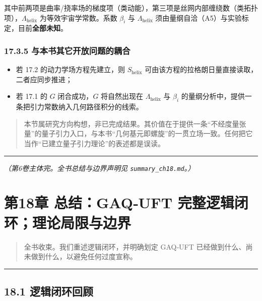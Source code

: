 其中前两项是曲率/挠率场的梯度项（类动能），第三项是丝网内部缠绕数（类拓扑项），\(\Lambda_{\mathrm{helix}}\)
为等效宇宙学常数。系数 \(\beta_i\) 与 \(\Lambda_{\mathrm{helix}}\)
须由量纲自洽（A5）与实验标定，目前\textbf{全部未知}。

\subsubsection{17.3.5
与本书其它开放问题的耦合}\label{ux4e0eux672cux4e66ux5176ux5b83ux5f00ux653eux95eeux9898ux7684ux8026ux5408}

\begin{itemize}
\tightlist
\item
  若 17.2 的动力学场方程先建立，则 \(S_{\mathrm{helix}}\)
  可由该方程的拉格朗日量直接读取，二者应同步推进；
\item
  若 17.1 的 \(G\) 闭合成功，\(G\) 将自然出现在
  \(\Lambda_{\mathrm{helix}}\) 与 \(\beta_i\)
  的量纲分析中，提供一条把引力常数纳入几何路径积分的线索。
\end{itemize}

\begin{quote}
本节属研究方向构想，非已完成结果。其价值在于提供一条``不经度量张量''的量子引力入口，与本书``几何基元即螺旋''的一贯立场一致。任何把它当作``已建立量子引力理论''的表述都是误读。
\end{quote}

\begin{center}\rule{0.5\linewidth}{0.5pt}\end{center}

\emph{（第6卷主体完。全书总结与边界声明见 \texttt{summary\_ch18.md}。）}

\section{第18章 总结：GAQ‑UFT
完整逻辑闭环；理论局限与边界}\label{ux7b2c18ux7ae0-ux603bux7ed3gaquft-ux5b8cux6574ux903bux8f91ux95edux73afux7406ux8bbaux5c40ux9650ux4e0eux8fb9ux754c-1}

\begin{quote}
全书收束。我们重述逻辑闭环，并明确划定 GAQ‑UFT
已经做到什么、尚未做到什么，以避免任何过度宣称。
\end{quote}

\begin{center}\rule{0.5\linewidth}{0.5pt}\end{center}

\subsection{18.1
逻辑闭环回顾}\label{ux903bux8f91ux95edux73afux56deux987e}

